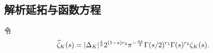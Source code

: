%
%

\subsection{解析延拓与函数方程}

令
  \[\widehat\zeta_K(s)=|\Delta_K|^\frac{s}{2} 2^{(1-s)r_2} \pi^{-\frac{ns}{2}}\Gamma(s/2)^{r_1}\Gamma(s)^{r_2}\zeta_K(s).\]

